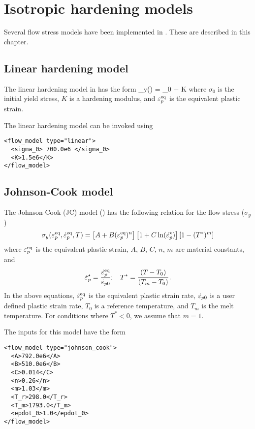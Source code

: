 \chapter{Isotropic hardening models}
Several flow stress models have been implemented in \Vaango.  These are described in this chapter.

\section{Linear hardening model}
The linear hardening model in \Vaango has the form
\Beq
  \sigma_y(\Ep) = \sigma_0 + K \Ep
\Eeq
where $\sigma_0$ is the initial yield stress, $K$ is a hardening modulus, and
$\varepsilon_p^\text{eq}$ is the equivalent plastic strain.

The linear hardening model can be invoked using
\lstset{language=XML}
\begin{lstlisting}
<flow_model type="linear">
  <sigma_0> 700.0e6 </sigma_0>
  <K>1.5e6</K>
</flow_model>
\end{lstlisting}

\section{Johnson-Cook model}
The Johnson-Cook (JC) model (\cite{Johnson1983}) has
the following relation for the flow stress ($\sigma_y$) 
\begin{equation}
  \sigma_y(\varepsilon_p^\text{eq},\dot{\varepsilon}_{p}^\text{eq},T) = 
  \left[A + B (\varepsilon_p^\text{eq})^n\right]\left[1 + C \ln(\dot{\varepsilon}_{p}^\star)\right]
  \left[1 - (T^*)^m\right]
\end{equation}
where $\varepsilon_p^\text{eq}$ is the equivalent plastic strain, 
$A$, $B$, $C$, $n$, $m$ are material constants, and
\begin{equation}
  \dot{\varepsilon}_{p}^\star = \cfrac{\dot{\varepsilon}_p^{\text{eq}}}{\dot{\varepsilon}_{p0}}; \quad
  T^* = \cfrac{(T-T_0)}{(T_m-T_0)}\,.
\end{equation}
In the above equations, $\dot{\varepsilon}_p^{\text{eq}}$ is the 
equivalent plastic strain rate, 
$\dot{\varepsilon}_{p0}$ is a user defined plastic strain rate, 
$T_0$ is a reference temperature, and $T_m$ is the melt temperature.  
For conditions where $T^* < 0$, we assume that $m = 1$.

The inputs for this model have the form
\lstset{language=XML}
\begin{lstlisting}
<flow_model type="johnson_cook">
  <A>792.0e6</A>
  <B>510.0e6</B>
  <C>0.014</C>
  <n>0.26</n>
  <m>1.03</m>
  <T_r>298.0</T_r>
  <T_m>1793.0</T_m>
  <epdot_0>1.0</epdot_0>
</flow_model>
\end{lstlisting}


